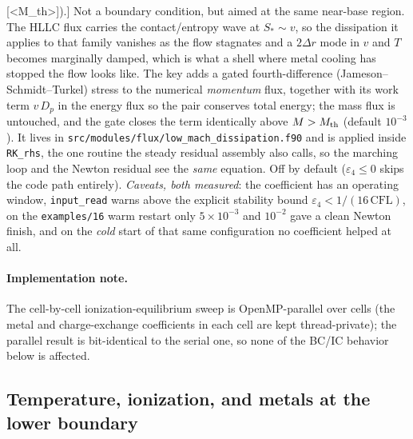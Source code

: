 \documentclass[english,a4paper]{my_memo}
\begin{document}
\begin{description}
{  [<M\_th>]}).] Not a boundary condition, but aimed at the same near-base
  region. The HLLC flux carries the contact/entropy wave at $S_* \sim v$, so
  the dissipation it applies to that family vanishes as the flow stagnates
  and a $2\Delta r$ mode in $v$ and $T$ becomes marginally damped, which is
  what a shell where metal cooling has stopped the flow looks like. The key
  adds a gated fourth-difference (Jameson--Schmidt--Turkel) stress to the
  numerical \emph{momentum} flux, together with its work term $v\,D_p$ in
  the energy flux so the pair conserves total energy; the mass flux is
  untouched, and the gate closes the term identically above
  $M > M_{\rm th}$ (default $10^{-3}$). It lives in
  \texttt{src/modules/flux/low\_mach\_dissipation.f90} and is applied inside
  \texttt{RK\_rhs}, the one routine the steady residual assembly also calls,
  so the marching loop and the Newton residual see the \emph{same} equation.
  Off by default ($\varepsilon_4 \le 0$ skips the code path entirely).
  \emph{Caveats, both measured}: the coefficient has
  an operating window, \texttt{input\_read} warns above the explicit
  stability bound $\varepsilon_4 < 1/(16\,\mathrm{CFL})$, on the
  \texttt{examples/16} warm restart only $5\times10^{-3}$ and $10^{-2}$ gave
  a clean Newton finish, and on the \emph{cold} start of that same
  configuration no coefficient helped at all.
\end{description}

\paragraph{Implementation note.}
The cell-by-cell ionization-equilibrium sweep is OpenMP-parallel over cells
(the metal and charge-exchange coefficients in each cell are kept
thread-private); the parallel result is bit-identical to the serial one, so
none of the BC/IC behavior below is affected.

\subsection{Temperature, ionization, and metals at the lower boundary}
\label{sec:metals-bc}
\end{document}
